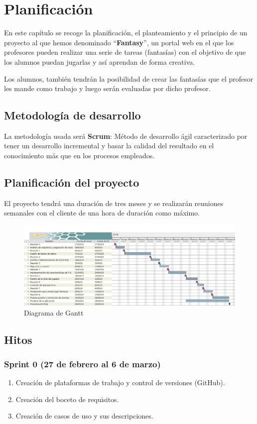 \chapter{Planificación}
En este capítulo se recoge la planificación, el planteamiento y el principio de un proyecto al que hemos denominado ``\textbf{Fantasy}'', un portal web en el que los profesores pueden realizar una serie de tareas (fantasías) con el objetivo de que los alumnos puedan jugarlas y así aprendan de forma creativa.

Los alumnos, también tendrán la posibilidad de crear las fantasías que el profesor les mande como trabajo y luego serán evaluadas por dicho profesor.

\section{Metodología de desarrollo}
La metodología usada será \textbf{Scrum}: Método de desarrollo ágil caracterizado por tener un desarrollo incremental y basar la calidad del resultado en el conocimiento más que en los procesos empleados.

\section{Planificación del proyecto}
El proyecto tendrá una duración de tres meses y se realizarán reuniones semanales con el cliente de una hora de duración como máximo.
\newpage
\begin{figure}[h]
	\centering
	\includegraphics[scale=0.35]{Fantasy.png}
	\caption{Diagrama de Gantt}
	\label{Diagrama de Gantt}
\end{figure}

\section{Hitos} %
\subsection{Sprint 0 (27 de febrero al 6 de marzo)}
\begin{enumerate}
	\item Creación de plataformas de trabajo y control de versiones (GitHub).
	\item Creación del boceto de requisitos.
	\item Creación de casos de uso y sus descripciones.
\end{enumerate}
